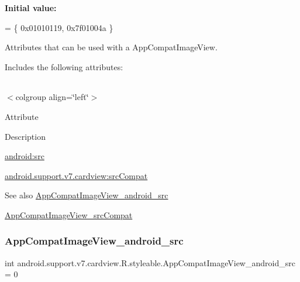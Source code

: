 {\bfseries Initial value\+:}
\begin{DoxyCode}
= \{
            0x01010119, 0x7f01004a
        \}
\end{DoxyCode}
Attributes that can be used with a App\+Compat\+Image\+View. 

Includes the following attributes\+:

\tabulinesep=1mm
\begin{longtabu} spread 0pt [c]{*{0}{|X[-1]}|}
\hline
\end{longtabu}
$<$colgroup align=\char`\"{}left\char`\"{}$>$ 

Attribute

Description 

{\ttfamily \hyperlink{classandroid_1_1support_1_1v7_1_1cardview_1_1R_1_1styleable_abbe7d50baa1c39921fd4886634bc23a7}{android\+:src}}

{\ttfamily \hyperlink{classandroid_1_1support_1_1v7_1_1cardview_1_1R_1_1styleable_a846bf5775d1a9c0dd8b2d322212fda3a}{android.\+support.\+v7.\+cardview\+:src\+Compat}}

\begin{DoxySeeAlso}{See also}
\hyperlink{classandroid_1_1support_1_1v7_1_1cardview_1_1R_1_1styleable_abbe7d50baa1c39921fd4886634bc23a7}{App\+Compat\+Image\+View\+\_\+android\+\_\+src} 

\hyperlink{classandroid_1_1support_1_1v7_1_1cardview_1_1R_1_1styleable_a846bf5775d1a9c0dd8b2d322212fda3a}{App\+Compat\+Image\+View\+\_\+src\+Compat} 
\end{DoxySeeAlso}
\mbox{\label{classandroid_1_1support_1_1v7_1_1cardview_1_1R_1_1styleable_abbe7d50baa1c39921fd4886634bc23a7}} 
\subsubsection{\texorpdfstring{App\+Compat\+Image\+View\+\_\+android\+\_\+src}{AppCompatImageView\_android\_src}}
{\footnotesize\ttfamily int android.\+support.\+v7.\+cardview.\+R.\+styleable.\+App\+Compat\+Image\+View\+\_\+android\+\_\+src = 0\hspace{0.3cm}{\ttfamily [static]}}

